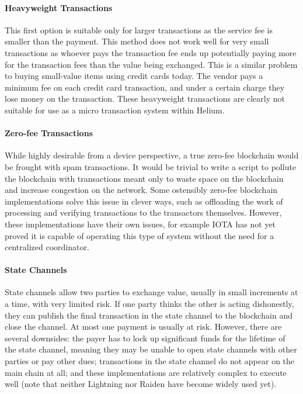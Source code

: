 \documentclass[10pt, nonatbib, nocopyrightspace, reprint]{sigplanconf}
\begin{document}
\paragraph{Heavyweight Transactions}
This first option is suitable only for larger transactions as the service fee is smaller than the payment. This method does not work well for very small transactions as whoever pays the transaction fee ends up potentially paying more for the transaction fees than the value being exchanged. This is a similar problem to buying small-value items using credit cards today. The vendor pays a minimum fee on each credit card transaction, and under a certain charge they lose money on the transaction. These heavyweight transactions are clearly not suitable for use as a micro transaction system within Helium.

\paragraph{Zero-fee Transactions}
While highly desirable from a device perspective, a true zero-fee blockchain would be frought with spam transactions. It would be trivial to write a script to pollute the blockchain with transactions meant only to waste space on the blockchain and increase congestion on the network. Some ostensibly zero-fee blockchain implementations solve this issue in clever ways, such as offloading the work of processing and verifying transactions to the transactors themselves. However, these implementations have their own issues, for example IOTA \cite{iota} has not yet proved it is capable of operating this type of system without the need for a centralized coordinator.

\paragraph{State Channels}
State channels \cite{state-channels} allow two parties to exchange value, usually in small increments at a time, with very limited risk. If one party thinks the other is acting dishonestly, they can publish the final transaction in the state channel to the blockchain and close the channel. At most one payment is usually at risk. However, there are several downsides: the payer has to lock up significant funds for the lifetime of the state channel, meaning they may be unable to open state channels with other parties or pay other dues; transactions in the state channel do not appear on the main chain at all; and these implementations are relatively complex to execute well (note that neither Lightning \cite{lightning} nor Raiden \cite{raiden} have become widely used yet).
\end{document}
